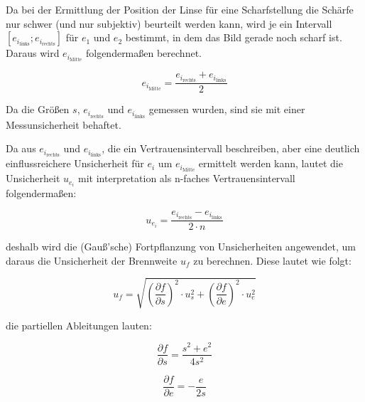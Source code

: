 \documentclass[a4paper,12pt]{article}
\begin{document}
Da bei der Ermittlung der Position der Linse für eine Scharfstellung die Schärfe nur schwer (und nur subjektiv)
beurteilt werden kann, wird je ein Intervall $[e_{i_\mathrm{links}};e_{i_\mathrm{rechts}}]$ für $e_1$ und
$e_2$ bestimmt, in dem das Bild gerade noch scharf ist. Daraus wird $e_{i_\mathrm{Mitte}}$ folgendermaßen berechnet.

\begin{equation}
    \label{eq:BesselAbstandIntervall}
    e_{i_\mathrm{Mitte}} = \frac{e_{i_\mathrm{rechts}} + e_{i_\mathrm{links}}}{2}
\end{equation}

Da die Größen $s$, $e_{i_\mathrm{rechts}}$ und $e_{i_\mathrm{links}}$ gemessen wurden, sind sie mit einer
Messunsicherheit behaftet. 


Da aus $e_{i_\mathrm{rechts}}$ und $e_{i_\mathrm{links}}$, die ein Vertrauensintervall beschreiben, aber eine
deutlich einflussreichere Unsicherheit für $e_i$ um $e_{i_\mathrm{Mitte}}$ ermittelt werden kann, lautet die
Unsicherheit $u_{e_i}$ mit interpretation als n-faches Vertrauensintervall folgendermaßen:

\begin{equation}
    \label{eq:BesselAbstandUnsicherheit}
    u_{e_i} = \frac{e_{i_\mathrm{rechts}} - e_{i_\mathrm{links}}}{2\cdot n}
\end{equation}


deshalb wird die (Gauß'sche) Fortpflanzung von Unsicherheiten angewendet,
um daraus die Unsicherheit der Brennweite $u_f$ zu berechnen. Diese lautet wie folgt:

\begin{equation}
    \label{eq:GaussUnsFortpfl}
    u_f = \sqrt{\left(\frac{\partial f}{\partial s}\right)^2 \cdot u_s^2 + \left(\frac{\partial f}{\partial e}\right)^2 \cdot u_e^2}
\end{equation}

die partiellen Ableitungen lauten:

\begin{equation}
    \frac{\partial f}{\partial s} = \frac{s^2+e^2}{4s^2}
\end{equation}

\begin{equation}
    \frac{\partial f}{\partial e} = -\frac{e}{2s}
\end{equation}
\end{document}
